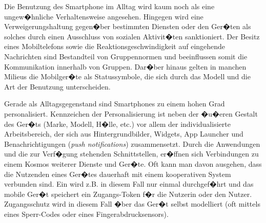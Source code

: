 Die Benutzung des Smartphone im Alltag wird kaum noch als eine ungew�hnliche Verhaltensweise angesehen. Hingegen wird eine Verweigerungshaltung gegen�ber bestimmten Diensten oder den Ger�ten als solches durch einen Ausschluss von sozialen Aktivit�ten sanktioniert. Der Besitz eines Mobiltelefons sowie die Reaktionsgeschwindigkeit auf eingehende Nachrichten sind Bestandteil von Gruppennormen und beeinflussen somit die Kommunikation innerhalb von Gruppen. Dar�ber hinaus gelten in manchen Milieus die Mobilger�te als Statussymbole, die sich durch das Modell und die Art der Benutzung unterscheiden. \cite{Fullwood2017}

Gerade als Alltagsgegenstand sind Smartphones zu einem hohen Grad personalisiert. Kennzeichen der Personalisierung ist neben der �u�eren Gestalt des Ger�ts (Marke, Modell, H�lle, etc.) vor allem der individualisierte Arbeitsbereich, der sich aus Hintergrundbilder, Widgets, App Launcher und Benachrichtigungen (\textit{push notifications}) zusammensetzt. Durch die Anwendungen und die zur Verf�gung stehenden Schnittstellen, er�ffnen sich Verbindungen zu einem Kosmos weiterer Dienste und Ger�te. 
Oft kann man davon ausgehen, dass die Nutzenden eines Ger�tes dauerhaft mit einem kooperativen System verbunden sind. Ein  wird z.B. in diesem Fall nur einmal durchgef�hrt und das mobile Ger�t speichert ein Zugangs-Token f�r die Nutzerin oder den Nutzer. Zugangsschutz wird in diesem Fall �ber das Ger�t selbst modelliert (oft mittels eines Sperr-Codes oder eines Fingerabdrucksensors). 



